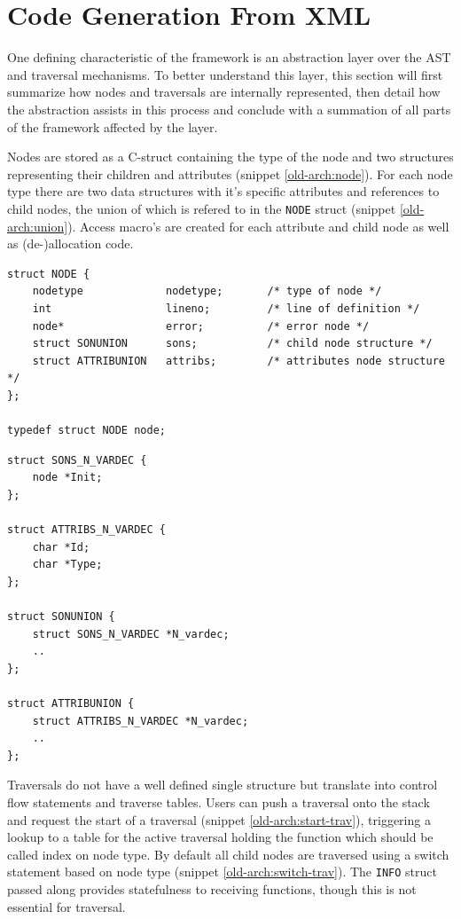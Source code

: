 \documentclass[twoside,openright]{uva-bachelor-thesis}
\newcommand{\code}[1]{\texttt{\footnotesize#1}}
\begin{document}
		
	\section{Code Generation From XML}
	\label{sec:old-sec}
			One defining characteristic of the framework is an abstraction layer over the AST and traversal mechanisms. To better understand this layer, this section will first summarize how nodes and traversals are internally represented, then detail how the abstraction assists in this process and conclude with a summation of all parts of the framework affected by the layer.
			
			Nodes are stored as a C-struct containing the type of the node and two structures representing their children and attributes (snippet \ref{old-arch:node}). For each node type there are two data structures with it's specific attributes and references to child nodes, the union of which is refered to in the \code{NODE} struct (snippet \ref{old-arch:union}). Access macro's are created for each attribute and child node as well as (de-)allocation code.
			
			\begin{lstlisting}[caption=Node structure,label=old-arch:node]
struct NODE {
	nodetype             nodetype;       /* type of node */
	int                  lineno;         /* line of definition */
	node*                error;          /* error node */
	struct SONUNION      sons;           /* child node structure */
	struct ATTRIBUNION   attribs;        /* attributes node structure */
};

typedef struct NODE node;
			\end{lstlisting}
			\begin{lstlisting}[caption=Sample child node and attribute union structures for node,label=old-arch:union]
struct SONS_N_VARDEC {
	node *Init;
};

struct ATTRIBS_N_VARDEC {
	char *Id;
	char *Type;
};

struct SONUNION {
	struct SONS_N_VARDEC *N_vardec;
	..
};

struct ATTRIBUNION {
	struct ATTRIBS_N_VARDEC *N_vardec;
	..
};
			\end{lstlisting}
			
			Traversals do not have a well defined single structure but translate into control flow statements and traverse tables. Users can push a traversal onto the stack and request the start of a traversal (snippet \ref{old-arch:start-trav}), triggering a lookup to a table for the active traversal holding the function which should be called index on node type. By default all child nodes are traversed using a switch statement based on node type (snippet \ref{old-arch:switch-trav}). The \code{INFO} struct passed along provides statefulness to receiving functions, though this is not essential for traversal.
			
\end{document}

